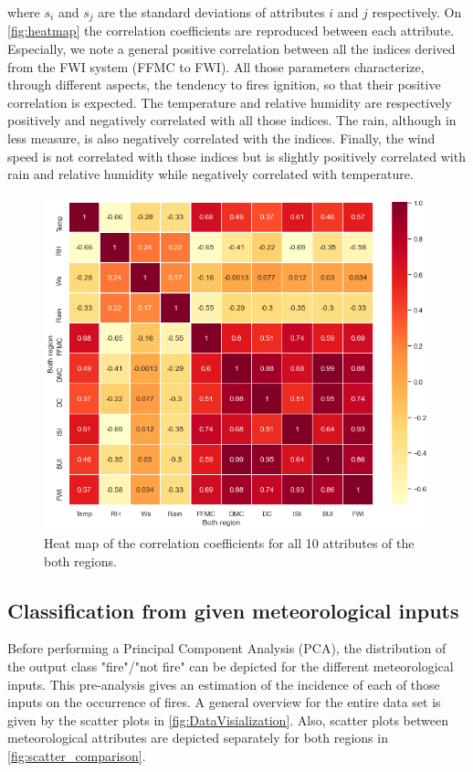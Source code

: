 \documentclass[10pt]{article}
\numberwithin{equation}{section}
\numberwithin{figure}{section}
\numberwithin{table}{section}
\begin{document}
\noindent where $s_i$ and $s_j$ are the standard deviations of attributes $i$ and $j$ respectively. On \autoref{fig:heatmap} the correlation coefficients are reproduced between each attribute. Especially, we note a general positive correlation between all the indices derived from the FWI system (FFMC to FWI). All those parameters characterize, through different aspects, the tendency to fires ignition, so that their positive correlation is expected. The temperature and relative humidity are respectively positively and negatively correlated with all those indices. The rain, although in less measure, is also negatively correlated with the indices. Finally, the wind speed is not correlated with those indices but is slightly positively correlated with rain and relative humidity while negatively correlated with temperature.

\begin{figure} [H]
    \centering
    \includegraphics[scale=0.50]{Figures/CorrelationMap2.png}
    \caption{Heat map of the correlation coefficients for all 10 attributes of the both regions.}
    \label{fig:heatmap}
\end{figure}

\subsection{Classification from given meteorological inputs}

Before performing a Principal Component Analysis (PCA), the distribution of the output class "fire"/"not fire" can be depicted for the different meteorological inputs. This pre-analysis gives an estimation of the incidence of each of those inputs on the occurrence of fires. A general overview for the entire data set is given by the scatter plots in \autoref{fig:DataVisialization}. Also, scatter plots between meteorological attributes are depicted separately for both regions in \autoref{fig:scatter_comparison}. 
\end{document}
